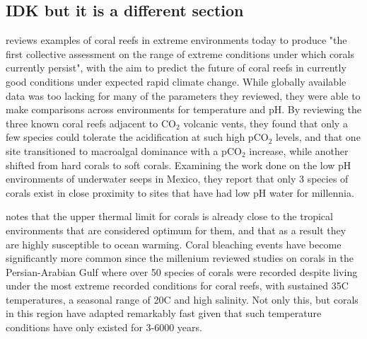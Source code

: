 \documentclass[11pt,a4paper]{article}
\begin{document}
\subsection{IDK but it is a different section}


\cite{Camp2018} reviews examples of coral reefs in extreme environments today to produce "the first collective assessment on the range of extreme conditions under which corals currently persist", with the aim to predict the future of coral reefs in currently good conditions under expected rapid climate change.
 While globally available data was too lacking for many of the parameters they reviewed, they were able to make comparisons across environments for temperature and pH.
 By reviewing the three known coral reefs adjacent to CO$_{2}$ volcanic vents, they found that only a few species could tolerate the acidification at such high pCO$_{2}$ levels, and that one site transitioned to macroalgal dominance with a pCO$_{2}$ increase, while another shifted from hard corals to soft corals.
 Examining the work done on the low pH environments of underwater seeps in Mexico, they report that only 3 species of corals exist in close proximity to sites that have had low pH water for millennia. 

\cite{Camp2018} notes that the upper thermal limit for corals is already close to the tropical environments that are considered optimum for them, and that as a result they are highly susceptible to ocean warming.
 Coral bleaching events have become significantly more common since the millenium %
\cite{Camp2018} reviewed studies on corals in the Persian-Arabian Gulf where over 50 species of corals were recorded despite living under the most extreme recorded conditions for coral reefs, with sustained 35\textdegree C temperatures, a seasonal range of 20\textdegree C and high salinity.
 Not only this, but corals in this region have adapted remarkably fast given that such temperature conditions have only existed for 3-6000 years.
\end{document}
